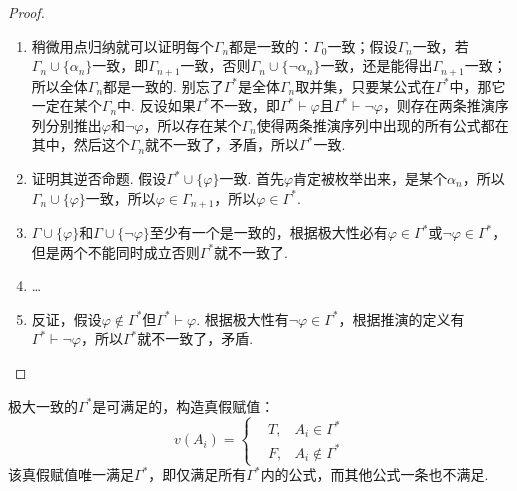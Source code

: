 \begin{proof}
    \begin{enumerate}[(1)]
        \item 稍微用点归纳就可以证明每个\(\Gamma_n\)都是一致的：\(\Gamma_0\)一致；假设\(\Gamma_n\)一致，若\(\Gamma_n \cup \{\alpha_n\}\)一致，即\(\Gamma_{n+1}\)一致，否则\(\Gamma_n \cup \{\neg \alpha_n\}\)一致，还是能得出\(\Gamma_{n+1}\)一致；所以全体\(\Gamma_n\)都是一致的. 别忘了\(\Gamma^*\)是全体\(\Gamma_n\)取并集，只要某公式在\(\Gamma^*\)中，那它一定在某个\(\Gamma_n\)中. 反设如果\(\Gamma^*\)不一致，即\(\Gamma^* \vdash \varphi\)且\(\Gamma^* \vdash \neg \varphi\)，则存在两条推演序列分别推出\(\varphi\)和\(\neg \varphi\)，所以存在某个\(\Gamma_n\)使得两条推演序列中出现的所有公式都在其中，然后这个\(\Gamma_n\)就不一致了，矛盾，所以\(\Gamma^*\)一致.
        \item 证明其逆否命题. 假设\(\Gamma^* \cup \{\varphi\}\)一致. 首先\(\varphi\)肯定被枚举出来，是某个\(\alpha_n\)，所以\(\Gamma_n \cup \{\varphi\}\)一致，所以\(\varphi \in \Gamma_{n+1}\)，所以\(\varphi \in \Gamma^*\).
        \item \(\Gamma \cup \{\varphi\}\)和\(\Gamma \cup \{\neg \varphi\}\)至少有一个是一致的，根据极大性必有\(\varphi \in \Gamma^*\)或\(\neg \varphi \in \Gamma^*\)，但是两个不能同时成立否则\(\Gamma^*\)就不一致了.
        \item \dots
        \item 反证，假设\(\varphi \not \in \Gamma^*\)但\(\Gamma^* \vdash \varphi\). 根据极大性有\(\neg \varphi \in \Gamma^*\)，根据推演的定义有\(\Gamma^* \vdash \neg \varphi\)，所以\(\Gamma^*\)就不一致了，矛盾. 
    \end{enumerate}
\end{proof}

\begin{lemma}{}
    极大一致的\(\Gamma^*\)是可满足的，构造真假赋值：
    \[ v(A_i) = \left\{ \begin{aligned} &T, & A_i \in \Gamma^* \\ &F, & A_i \not \in \Gamma^* \end{aligned} \right.\]
    该真假赋值唯一满足\(\Gamma^*\)，即仅满足所有\(\Gamma^*\)内的公式，而其他公式一条也不满足.
\end{lemma}

